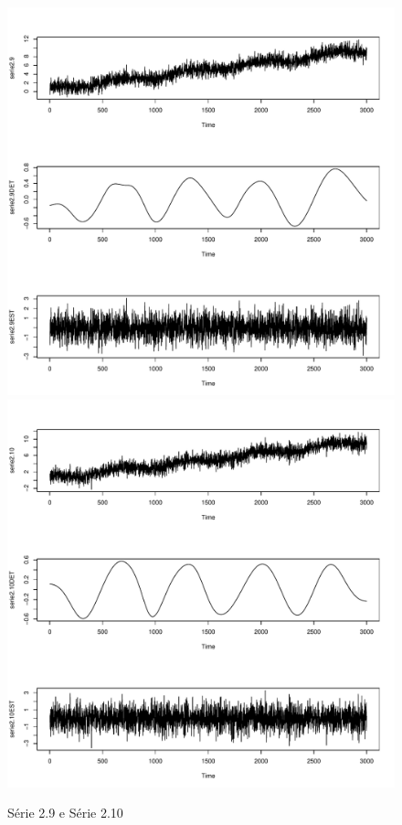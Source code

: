 \graphicspath{{imagens/}}
\begin{figure}[H]
\begin{center}
  \includegraphics[scale=0.43]{serie2_9.pdf} \quad
  \includegraphics[scale=0.43]{serie2_10.pdf}
  \caption{Série 2.9 e Série 2.10}

\end{center}
\end{figure}

